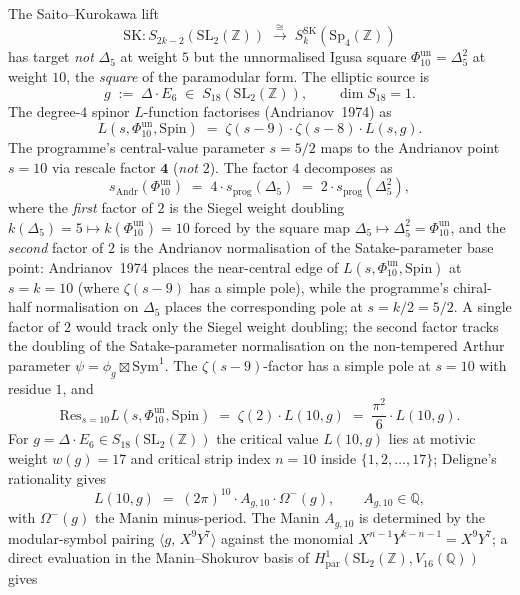 \begin{theorem}
\label{thm:k3e-saito-kurokawa-residue}
The Saito--Kurokawa lift
\[
 \mathrm{SK} \colon S_{2k - 2}(\mathrm{SL}_2(\mathbb{Z})) \;\xrightarrow{\cong}\; S_k^{\mathrm{SK}}(\mathrm{Sp}_4(\mathbb{Z}))
\]
has target \emph{not} $\Delta_5$ at weight $5$ but the unnormalised
Igusa square \(\Phi_{10}^{\mathrm{un}}=\Delta_5^2\) at weight $10$, the
\emph{square} of the paramodular form. The elliptic source is
\[
 g \;:=\; \Delta \cdot E_6 \;\in\; S_{18}(\mathrm{SL}_2(\mathbb{Z})), \qquad \dim S_{18} = 1.
\]
The degree-$4$ spinor $L$-function factorises (Andrianov~1974) as
\[
 L(s, \Phi_{10}^{\mathrm{un}}, \mathrm{Spin}) \;=\; \zeta(s - 9) \cdot \zeta(s - 8) \cdot L(s, g).
\]
The programme's central-value parameter $s = 5/2$ maps to the Andrianov point $s = 10$ via rescale factor $\mathbf{4}$ (\emph{not} $2$). The factor $4$ decomposes as
\[
 s_{\mathrm{Andr}}(\Phi_{10}^{\mathrm{un}}) \;=\; 4 \cdot s_{\mathrm{prog}}(\Delta_5) \;=\; 2 \cdot s_{\mathrm{prog}}(\Delta_5^2),
\]
where the \emph{first} factor of $2$ is the Siegel weight doubling \(k(\Delta_5)=5 \mapsto k(\Phi_{10}^{\mathrm{un}})=10\) forced by the square map \(\Delta_5 \mapsto \Delta_5^2=\Phi_{10}^{\mathrm{un}}\), and the \emph{second} factor of $2$ is the Andrianov normalisation of the Satake-parameter base point: Andrianov~1974 places the near-central edge of \(L(s,\Phi_{10}^{\mathrm{un}},\mathrm{Spin})\) at $s = k = 10$ (where $\zeta(s - 9)$ has a simple pole), while the programme's chiral-half normalisation on $\Delta_5$ places the corresponding pole at $s = k/2 = 5/2$. A single factor of $2$ would track only the Siegel weight doubling; the second factor tracks the doubling of the Satake-parameter normalisation on the non-tempered Arthur parameter $\psi = \phi_g \boxtimes \mathrm{Sym}^1$. The $\zeta(s - 9)$-factor has a simple pole at $s = 10$ with residue $1$, and
\[
 \mathrm{Res}_{s = 10} L(s, \Phi_{10}^{\mathrm{un}}, \mathrm{Spin}) \;=\; \zeta(2) \cdot L(10, g) \;=\; \frac{\pi^2}{6} \cdot L(10, g).
\]
For $g = \Delta \cdot E_6 \in S_{18}(\mathrm{SL}_2(\mathbb{Z}))$ the critical value $L(10, g)$ lies at motivic weight $w(g) = 17$ and critical strip index $n = 10$ inside $\{1, 2, \ldots, 17\}$; Deligne's rationality gives
\[
 L(10, g) \;=\; (2\pi)^{10} \cdot A_{g, 10} \cdot \Omega^-(g), \qquad A_{g, 10} \in \mathbb{Q},
\]
with $\Omega^-(g)$ the Manin minus-period. The Manin $A_{g, 10}$ is determined by the modular-symbol pairing $\langle g,\, X^{9} Y^{7} \rangle$ against the monomial $X^{n - 1} Y^{k - n - 1} = X^{9} Y^{7}$; a direct evaluation in the Manin--Shokurov basis of $H^1_{\mathrm{par}}(\mathrm{SL}_2(\mathbb{Z}), V_{16}(\mathbb{Q}))$ gives

\end{theorem}
